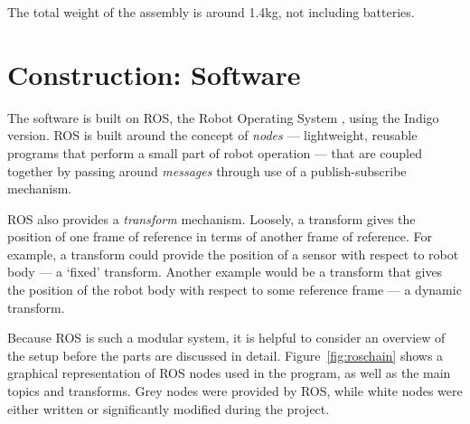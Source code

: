\documentclass[12pt,oneside,a4paper]{book}
\begin{document}
The total weight of the assembly is around 1.4kg, not including batteries.

\chapter{Construction: Software}
\label{sec:software}

The software is built on ROS, the Robot Operating System
\cite{rosos}, using the Indigo version. ROS is built around the
concept of \emph{nodes} --- lightweight, reusable programs that perform a small
part of robot operation --- that are coupled together by passing
around \emph{messages} through use of a publish-subscribe mechanism.

ROS also provides a \emph{transform} mechanism. Loosely, a transform
gives the position of one frame of reference in terms of another frame
of reference. For example, a transform could provide the position of a
sensor with respect to robot body --- a `fixed' transform. Another
example would be a transform that gives the position of the robot body with
respect to some reference frame --- a dynamic transform.

Because ROS is such a modular system, it is helpful to consider an
overview of the setup before the parts are discussed in
detail. Figure~\ref{fig:roschain} shows a graphical representation of
ROS nodes used in the program, as well as the main topics and
transforms. Grey nodes were provided by ROS, while white nodes were
either written or significantly modified during the project.
\end{document}

